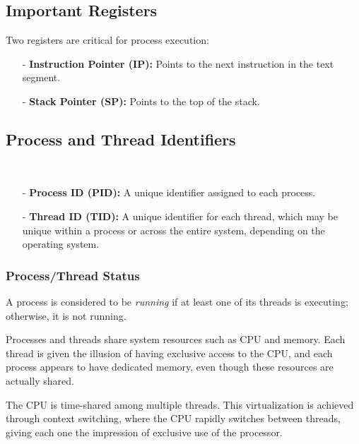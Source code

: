 \subsection{Important Registers}
\begin{definition}
Two registers are critical for process execution:
\begin{itemize}
  \item[-] \textbf{Instruction Pointer (IP):} Points to the next instruction in the text segment.
  \item[-] \textbf{Stack Pointer (SP):} Points to the top of the stack.
\end{itemize}
\end{definition}

\subsection{Process and Thread Identifiers}
\begin{definition}
\leavevmode\\ %

\begin{itemize}
  \item[-] \textbf{Process ID (PID):} A unique identifier assigned to each process.
  \item[-] \textbf{Thread ID (TID):} A unique identifier for each thread, which may be unique within a process or across the entire system, depending on the operating system.
\end{itemize}

\end{definition}
\subsubsection{Process/Thread Status}
A process is considered to be \emph{running} if at least one of its threads is executing; otherwise, it is not running.


\begin{definition}
Processes and threads share system resources such as CPU and memory. Each thread is given the illusion of having exclusive access to the CPU, and each process appears to have dedicated memory, even though these resources are actually shared.
\end{definition}


\begin{definition}
The CPU is time-shared among multiple threads. This virtualization is achieved through context switching, where the CPU rapidly switches between threads, giving each one the impression of exclusive use of the processor.
\end{definition}


